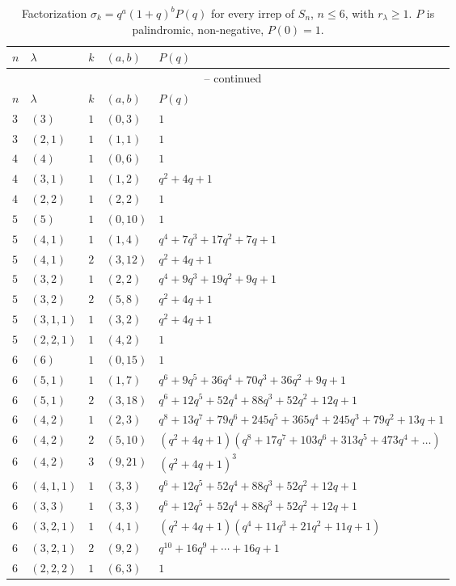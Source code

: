 \documentclass[11pt]{article}
\theoremstyle{definition}
\begin{document}
\begin{longtable}{lllll}
\caption{Factorization $\sigma_k=q^a(1+q)^bP(q)$ for every irrep of
$S_n$, $n\le 6$, with $r_\lambda\ge 1$. $P$ is palindromic,
non-negative, $P(0)=1$.}\label{tab:data}\\
\toprule
$n$ & $\lambda$ & $k$ & $(a,b)$ & $P(q)$ \\
\midrule
\endfirsthead
\multicolumn{5}{c}{\tablename\ \thetable{} -- continued}\\
\toprule
$n$ & $\lambda$ & $k$ & $(a,b)$ & $P(q)$ \\
\midrule
\endhead
$3$ & $(3)$    & $1$ & $(0,3)$  & $1$ \\
$3$ & $(2,1)$  & $1$ & $(1,1)$  & $1$ \\
\midrule
$4$ & $(4)$    & $1$ & $(0,6)$  & $1$ \\
$4$ & $(3,1)$  & $1$ & $(1,2)$  & $q^2+4q+1$ \\
$4$ & $(2,2)$  & $1$ & $(2,2)$  & $1$ \\
\midrule
$5$ & $(5)$    & $1$ & $(0,10)$  & $1$ \\
$5$ & $(4,1)$  & $1$ & $(1,4)$   & $q^4+7q^3+17q^2+7q+1$ \\
$5$ & $(4,1)$  & $2$ & $(3,12)$  & $q^2+4q+1$ \\
$5$ & $(3,2)$  & $1$ & $(2,2)$   & $q^4+9q^3+19q^2+9q+1$ \\
$5$ & $(3,2)$  & $2$ & $(5,8)$   & $q^2+4q+1$ \\
$5$ & $(3,1,1)$ & $1$ & $(3,2)$  & $q^2+4q+1$ \\
$5$ & $(2,2,1)$ & $1$ & $(4,2)$  & $1$ \\
\midrule
$6$ & $(6)$    & $1$ & $(0,15)$   & $1$ \\
$6$ & $(5,1)$  & $1$ & $(1,7)$    & $q^6+9q^5+36q^4+70q^3+36q^2+9q+1$ \\
$6$ & $(5,1)$  & $2$ & $(3,18)$   & $q^6+12q^5+52q^4+88q^3+52q^2+12q+1$ \\
$6$ & $(4,2)$  & $1$ & $(2,3)$    & $q^8+13q^7+79q^6+245q^5+365q^4+245q^3+79q^2+13q+1$ \\
$6$ & $(4,2)$  & $2$ & $(5,10)$   & $(q^2+4q+1)(q^8+17q^7+103q^6+313q^5+473q^4+\ldots)$ \\
$6$ & $(4,2)$  & $3$ & $(9,21)$   & $(q^2+4q+1)^3$ \\
$6$ & $(4,1,1)$ & $1$ & $(3,3)$   & $q^6+12q^5+52q^4+88q^3+52q^2+12q+1$ \\
$6$ & $(3,3)$   & $1$ & $(3,3)$   & $q^6+12q^5+52q^4+88q^3+52q^2+12q+1$ \\
$6$ & $(3,2,1)$ & $1$ & $(4,1)$   & $(q^2+4q+1)(q^4+11q^3+21q^2+11q+1)$ \\
$6$ & $(3,2,1)$ & $2$ & $(9,2)$   & $q^{10}+16q^9+\cdots+16q+1$ \\
$6$ & $(2,2,2)$ & $1$ & $(6,3)$   & $1$ \\
\bottomrule
\end{longtable}
\end{document}
